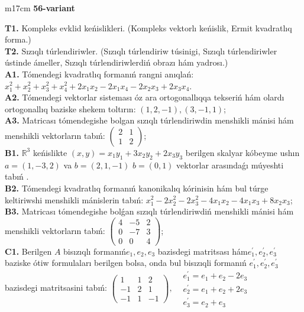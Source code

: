 \documentclass{article}
\begin{document}
\begin{tabular}{m{17cm}}
\textbf{56-variant}
\newline

\textbf{T1.} Kompleks evklid keńislikleri.  (Kompleks vektorlı keńislik, Ermit kvadratlıq forma.) \\
\textbf{T2.} Sızıqlı túrlendiriwler.  (Sızıqlı túrlendiriw túsinigi, Sızıqlı túrlendiriwler ústinde ámeller, Sızıqlı túrlendiriwlerdiń obrazı hám yadrosı.) \\
\textbf{A1.} Tómendegi kvadratlıq formanıń rangni anıqlań: \(x_{1}^{2} + x_{2}^{2} + x_{3}^{2} + x_{4}^{2} + 2x_{1}x_{2} - 2x_{1}x_{4} - 2x_{2}x_{3} + 2x_{3}x_{4}\). \\
\textbf{A2.} Tómendegi vektorlar sisteması óz ara ortogonallıqqa tekseriń hám olardı ortogonallıq baziske shekem toltırın: \((1,2, - 1),(3, - 1,1)\); \\
\textbf{A3.} Matricası tómendegishe bolgan sızıqlı túrlendiriwdin menshikli mánisi hám menshikli vektorların tabıń: \(\begin{pmatrix} 2 & 1 \\ 1 & 2 \end{pmatrix}\); \\
\textbf{B1.} \(\mathbb{R}^{3}\) keńislikte \((x,y) = x_{1}y_{1} + 3x_{2}y_{2} + 2x_{3}y_{3}\) berilgen skalyar kóbeyme ushın \(a = (1, - 3,2)\) va \(b = (2,1, - 1)\) \(b = (0,1)\) vektorlar arasındaǵı múyeshti tabıń . \\
\textbf{B2.} Tómendegi kvadratlıq formanıń kanonikalıq kórinisin hám bul túrge keltiriwshi menshikli mánislerin tabıń: \(x_{1}^{2} - 2x_{2}^{2} - 2x_{3}^{2} - 4x_{1}x_{2} - 4x_{1}x_{3} + 8x_{2}x_{3}\); \\
\textbf{B3.} Matricası tómendegishe bolǵan sızıqlı túrlendiriwdiń menshikli mánisi hám menshikli vektorların tabıń: \(\begin{pmatrix} 4 & - 5 & 2 \\ 0 & - 7 & 3 \\ 0 & 0 & 4 \end{pmatrix}\); \\
\textbf{C1.} Berilgen \(A\) bisızıqlı formanıń\(e_{1},e_{2},e_{3}\) bazisdegi matritsası hám\(e_{1}^{'},e_{2}^{'},e_{3}^{'}\) baziske ótiw formulaları berilgen bolsa, onda bul bisızıqli formanıń \(e_{1}^{'},e_{2}^{'},e_{3}^{'}\) bazisdegi matritsasini tabıń: \(\begin{pmatrix} 1 & 1 & 2 \\  - 1 & 2 & 1 \\  - 1 & 1 & - 1 \end{pmatrix},\begin{matrix}  & e_{1}^{'} = e_{1} + e_{2} - 2e_{3} \\  & e_{2}^{'} = e_{1} + e_{2} + 2e_{3} \\  & e_{3}^{'} = e_{2} + e_{3} \end{matrix}\) \\

\end{tabular}
\end{document}
